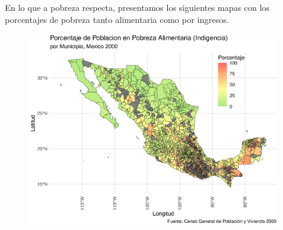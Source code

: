 \documentclass[9pt]{article}
\begin{document}
 En lo que a pobreza respecta, presentamos los siguientes mapas con los porcentajes de pobreza tanto alimentaria como por ingresos. 
 
 \begin{figure}[H]
     \centering
     \includegraphics[width=0.97\textwidth]{figs/povertyalim.eps}
 \end{figure}
 
\end{document}
